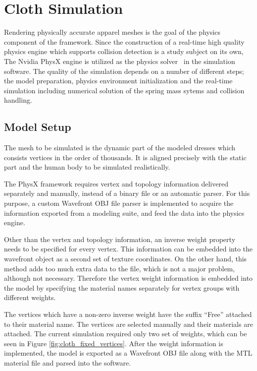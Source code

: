 \chapter{Cloth Simulation}
\label{chapter_cloth_simulation}

Rendering physically accurate apparel meshes is the goal of the physics component of the framework. Since the construction of a real-time high quality physics engine which supports collision detection is a study subject on its own, The Nvidia PhysX engine is utilized as the physics solver~\cite{Kim2011} in the simulation software. The quality of the simulation depends on a number of different steps; the model preparation, physics environment initialization and the real-time simulation including numerical solution of the spring mass sytems and collision handling. 

\section{Model Setup}
The mesh to be simulated is the dynamic part of the modeled dresses which consists vertices in the order of thousands. It is aligned precisely with the static part and the human body to be simulated realistically. 

The PhysX framework requires vertex and topology information delivered separately and manually, instead of a binary file or an automatic parser. For this purpose, a custom Wavefront OBJ file parser is implemented to acquire the information exported from a modeling suite, and feed the data into the physics engine. 

Other than the vertex and topology information, an inverse weight property needs to be specified for every vertex.  This information can be embedded into the wavefront object as a second set of texture coordinates. On the other hand, this method adds too much extra data to the file, which is not a major problem, although not necessary. Therefore the vertex weight information is embedded into the model by specifying the material names separately for vertex groups with different weights. 

The vertices which have a non-zero inverse weight have the suffix ``Free'' attached to their material name. The vertices are selected manually and their materials are attached.  The current simulation required only two set of weights, which can be seen in Figure \ref{fig:cloth_fixed_vertices}. After the weight information is implemented, the model is exported as a Wavefront OBJ file along with the MTL material file and parsed into the software.

